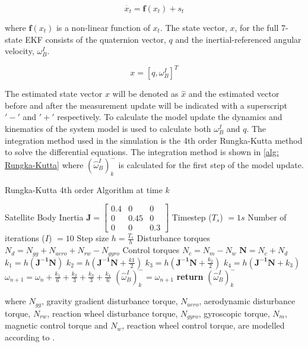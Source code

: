 \begin{equation}
	\dot{x_t} = \mathbf{f}(x_t) + s_t
\end{equation}

where $\mathbf{f}(x_t)$ is a non-linear function of $x_t$. The state vector, $x$, for the full 7-state EKF consists of the quaternion vector, $q$ and the inertial-referenced angular velocity, $\omega_B^I$.

\begin{equation}
	x = [q, \omega_B^I]^T
\end{equation}

The estimated state vector $x$ will be denoted as $\hat{x}$ and the estimated vector before and after the measurement update will be indicated with a superscript $'-'$ and $'+'$ respectively. To calculate the model update the dynamics and kinematics of the system model is used to calculate both $\omega_B^I$ and $q$. The integration method used in the simulation is the 4th order Rungka-Kutta method to solve the differential equations. The integration method is shown in \ref{alg: Rungka-Kutta} where $(\hat{\omega}_B^I)_k^-$ is calculated for the first step of the model update.

\begin{algorithm}[!htb]
	\caption[Rungka-Kutta]{Rungka-Kutta 4th order Algorithm at time $k$}
	\label{alg: Rungka-Kutta}
	\begin{algorithmic}[1]
		\State Satellite Body Inertia $\mathbf{J} = \begin{bmatrix}
			0.4 & 0 & 0\\
			0 & 0.45 & 0 \\
			0 & 0 & 0.3
		\end{bmatrix}$
		\State Timestep ($T_s$) $= 1s$
		\State Number of iterations ($I$) $= 10$
		\State Step size $h = \frac{T_s}{h}$
		\State Disturbance torques $N_d = N_{gg} + N_{aero} + N_{rw} - N_{gyro}$
		\State Control torques $N_c = N_m - N_w$
		\State $\mathbf{N} = N_c + N_d$
		\State \texttt{$k_1 = h(\mathbf{J^{-1}}\mathbf{N})$}
		\State \texttt{$k_2 = h(\mathbf{J^{-1}}\mathbf{N} + \frac{k1}{2})$}
		\State \texttt{$k_3 = h(\mathbf{J^{-1}}\mathbf{N} + \frac{k_2}{2})$}
		\State \texttt{$k_4 = h(\mathbf{J^{-1}}\mathbf{N} + k_3)$}
		\State \texttt{$\omega_{n+1}=\omega_n + \frac{k_1}{6} + \frac{k_2}{3} + \frac{k_3}{3} + \frac{k_4}{6}$}
		\EndFor
		\State $(\hat{\omega}_B^I)_k^- = \omega_{n+1}$
		\State \textbf{return} $(\hat{\omega}_B^I)_k^-$
	\end{algorithmic}
\end{algorithm}
where $N_{gg}$, gravity gradient disturbance torque, $N_{aero}$, aerodynamic disturbance torque, $N_{rw}$, reaction wheel disturbance torque, $N_{gyro}$, gyroscopic torque, $N_m$, magnetic control torque and $N_w$, reaction wheel control torque, are modelled according to \cite{JansevanVuuren2015}. 

